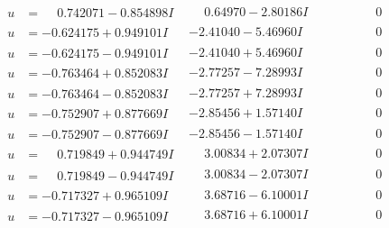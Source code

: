 \documentclass[1p]{elsarticle_modified}
\theoremstyle{definition}
\begin{document}
$$\begin{array}{c|c|c}
\begin{aligned}
u &= \phantom{-}0.742071 - 0.854898 I\end{aligned}
 & \phantom{-}0.64970 - 2.80186 I & \phantom{-0.000000 } 0 \\ \hline\begin{aligned}
u &= -0.624175 + 0.949101 I\end{aligned}
 & -2.41040 - 5.46960 I & \phantom{-0.000000 } 0 \\ \hline\begin{aligned}
u &= -0.624175 - 0.949101 I\end{aligned}
 & -2.41040 + 5.46960 I & \phantom{-0.000000 } 0 \\ \hline\begin{aligned}
u &= -0.763464 + 0.852083 I\end{aligned}
 & -2.77257 - 7.28993 I & \phantom{-0.000000 } 0 \\ \hline\begin{aligned}
u &= -0.763464 - 0.852083 I\end{aligned}
 & -2.77257 + 7.28993 I & \phantom{-0.000000 } 0 \\ \hline\begin{aligned}
u &= -0.752907 + 0.877669 I\end{aligned}
 & -2.85456 + 1.57140 I & \phantom{-0.000000 } 0 \\ \hline\begin{aligned}
u &= -0.752907 - 0.877669 I\end{aligned}
 & -2.85456 - 1.57140 I & \phantom{-0.000000 } 0 \\ \hline\begin{aligned}
u &= \phantom{-}0.719849 + 0.944749 I\end{aligned}
 & \phantom{-}3.00834 + 2.07307 I & \phantom{-0.000000 } 0 \\ \hline\begin{aligned}
u &= \phantom{-}0.719849 - 0.944749 I\end{aligned}
 & \phantom{-}3.00834 - 2.07307 I & \phantom{-0.000000 } 0 \\ \hline\begin{aligned}
u &= -0.717327 + 0.965109 I\end{aligned}
 & \phantom{-}3.68716 - 6.10001 I & \phantom{-0.000000 } 0 \\ \hline\begin{aligned}
u &= -0.717327 - 0.965109 I\end{aligned}
 & \phantom{-}3.68716 + 6.10001 I & \phantom{-0.000000 } 0 \\ \hline\begin{aligned}

\end{aligned}
\end{array}$$
\end{document}
